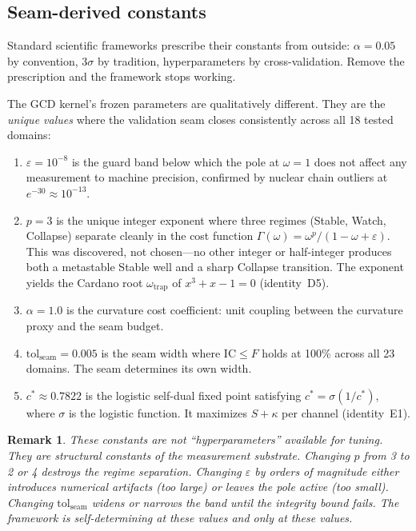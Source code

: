 \documentclass[
  aps,
  prd,
  twocolumn,
  superscriptaddress,
  nofootinbib,
  floatfix
]{revtex4-2}
\newtheorem{remark}{Remark}
\newcommand{\Gam}{\Gamma}
\newcommand{\eps}{\varepsilon}
\newcommand{\tolseam}{\mathrm{tol}_{\mathrm{seam}}}
\newcommand{\IC}{\mathrm{IC}}
\begin{document}
\subsection{Seam-derived constants}

Standard scientific frameworks prescribe their constants from outside:
$\alpha = 0.05$ by convention, $3\sigma$ by tradition, hyperparameters
by cross-validation.  Remove the prescription and the framework stops
working.

The GCD kernel's frozen parameters are qualitatively different.  They
are the \emph{unique values} where the validation seam closes
consistently across all 18 tested domains:

\begin{enumerate}[leftmargin=*,label=(\roman*)]
\item $\eps = 10^{-8}$ is the guard band below which the pole at
  $\omega = 1$ does not affect any measurement to machine precision,
  confirmed by nuclear chain outliers at $e^{-30} \approx 10^{-13}$.

\item $p = 3$ is the unique integer exponent where three regimes
  (Stable, Watch, Collapse) separate cleanly in the cost function
  $\Gam(\omega) = \omega^p/(1 - \omega + \eps)$.  This was
  discovered, not chosen---no other integer or half-integer produces
  both a metastable Stable well and a sharp Collapse transition.
  The exponent yields the Cardano root $\omega_{\mathrm{trap}}$
  of $x^3 + x - 1 = 0$ (identity~D5).

\item $\alpha = 1.0$ is the curvature cost coefficient: unit coupling
  between the curvature proxy and the seam budget.

\item $\tolseam = 0.005$ is the seam width where $\IC \leq F$ holds
  at 100\% across all 23 domains.  The seam determines its own width.

\item $c^* \approx 0.7822$ is the logistic self-dual fixed point
  satisfying $c^* = \sigma(1/c^*)$, where $\sigma$ is the logistic
  function.  It maximizes $S + \kappa$ per channel (identity~E1).
\end{enumerate}

\begin{remark}
These constants are not ``hyperparameters'' available for tuning.
They are structural constants of the measurement substrate.  Changing
$p$ from 3 to 2 or 4 destroys the regime separation.  Changing
$\eps$ by orders of magnitude either introduces numerical artifacts
(too large) or leaves the pole active (too small).  Changing
$\tolseam$ widens or narrows the band until the integrity bound
fails.  The framework is self-determining at these values and only at
these values.
\end{remark}
\end{document}
